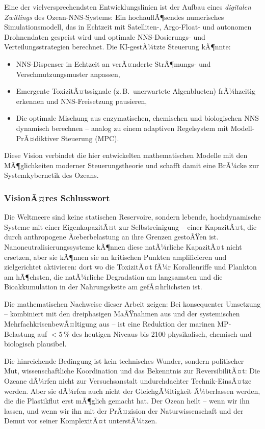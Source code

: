 ﻿\documentclass[12pt,a4paper]{article}
\theoremstyle{definition}
\theoremstyle{remark}
\begin{document}
Eine der vielversprechendsten Entwicklungslinien ist der Aufbau eines
\emph{digitalen Zwillings} des Ozean-NNS-Systems: Ein hochauflÃ¶sendes
numerisches Simulationsmodell, das in Echtzeit mit Satelliten-,
Argo-Float- und autonomen Drohnendaten gespeist wird und optimale
NNS-Dosierungs- und Verteilungsstrategien berechnet. Die KI-gestÃ¼tzte
Steuerung kÃ¶nnte:

\begin{itemize}
  \item NNS-Dispenser in Echtzeit an verÃ¤nderte StrÃ¶mungs- und
        Verschmutzungsmuster anpassen,
  \item Emergente ToxizitÃ¤tssignale (z.\,B.\ unerwartete Algenblueten)
        frÃ¼hzeitig erkennen und NNS-Freisetzung pausieren,
  \item Die optimale Mischung aus enzymatischen, chemischen und
        biologischen NNS dynamisch berechnen -- analog zu einem
        adaptiven Regelsystem mit Modell-PrÃ¤diktiver Steuerung (MPC).
\end{itemize}

Diese Vision verbindet die hier entwickelten mathematischen Modelle
mit den MÃ¶glichkeiten moderner Steuerungstheorie und schafft damit
eine BrÃ¼cke zur Systemkybernetik des Ozeans.

\subsubsection{VisionÃ¤res Schlusswort}

Die Weltmeere sind keine statischen Reservoire, sondern lebende, hochdynamische
Systeme mit einer EigenkapazitÃ¤t zur Selbstreinigung -- einer KapazitÃ¤t,
die durch anthropogene Ãœberbelastung an ihre Grenzen gestoÃŸen ist.
Nanoneutralisierungssysteme kÃ¶nnen diese natÃ¼rliche KapazitÃ¤t nicht ersetzen,
aber sie kÃ¶nnen sie an kritischen Punkten amplificieren und zielgerichtet
aktivieren: dort wo die ToxizitÃ¤t fÃ¼r Korallenriffe und Plankton am hÃ¶chsten,
die natÃ¼rliche Degradation am langsamsten und die Bioakkumulation in der
Nahrungskette am gefÃ¤hrlichsten ist.

Die mathematischen Nachweise dieser Arbeit zeigen:
Bei konsequenter Umsetzung -- kombiniert mit den dreiphasigen MaÃŸnahmen aus
\cite{cleanocn_epp2026} und der systemischen MehrfachkrisenbewÃ¤ltigung aus
\cite{ocnscnce_epp2026} -- ist eine Reduktion der marinen MP-Belastung auf
$< 5\,\%$ des heutigen Niveaus bis 2100 physikalisch, chemisch und biologisch
plausibel.

Die hinreichende Bedingung ist kein technisches Wunder, sondern politischer Mut,
wissenschaftliche Koordination und das Bekenntnis zur ReversibilitÃ¤t:
Die Ozeane dÃ¼rfen nicht zur Versuchsanstalt undurchdachter Technik-EinsÃ¤tze
werden. Aber sie dÃ¼rfen auch nicht der GleichgÃ¼ltigkeit Ã¼berlassen werden,
die die Plastikflut erst mÃ¶glich gemacht hat. Der Ozean heilt -- wenn wir
ihn lassen, und wenn wir ihn mit der PrÃ¤zision der Naturwissenschaft
und der Demut vor seiner KomplexitÃ¤t unterstÃ¼tzen.
\end{document}
